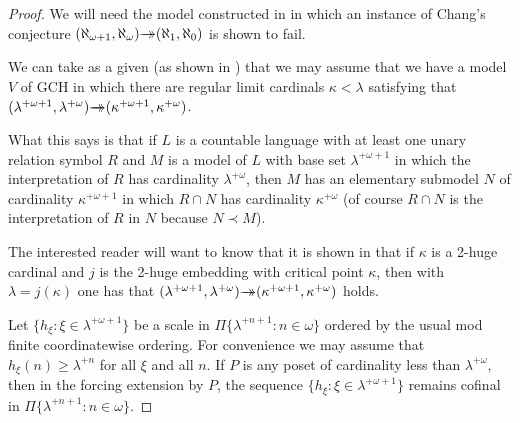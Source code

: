 \documentclass{amsart}
\theoremstyle{plain}
\theoremstyle{definition}
\theoremstyle{remark}
\theoremstyle{plain}
\theoremstyle{definition}
\theoremstyle{remark}
\begin{document}
  \begin{proof}
          We will need the model constructed in \cite{MR1045371} in
           which an instance of Chang's conjecture
           $(\aleph_{\omega+1},\aleph_\omega) \rlap{$\rightarrow$}\,{\rightarrow}
           (\aleph_1,\aleph_0)$ is shown to fail.

          We can take as a given (as shown in \cite[Theorem 5]{MR1045371}) that we may
          assume that we have a model $V$
          of GCH in which there are regular limit cardinals $\kappa<\lambda$
          satisfying that
          $(\lambda^{+\omega+1},\lambda^{+\omega})\rlap{$\rightarrow$}\,{\rightarrow}
          (\kappa^{+\omega+1},\kappa^{+\omega})$.


          What this says is that if $L$ is a countable language
          with at least one unary relation symbol $R$ and
           $M$ is a model of $L$  with base set $\lambda^{+\omega+1}$
          in which the interpretation of $R$ has cardinality
           $\lambda^{+\omega}$, then $M$ has an elementary submodel
           $N$ of cardinality $\kappa^{+\omega+1}$ in which
          $R\cap N$ has cardinality $\kappa^{+\omega}$ (of course
           $R\cap N$ is the interpretation of $R$ in $N$ because
          $N\prec M$).

          The interested reader will want to know that it is shown in
          \cite{MR1045371} that if $\kappa$ is a 2-huge cardinal and $j$ is the 2-huge
          embedding with critical point $\kappa$, then with
           $\lambda = j(\kappa)$ one has that
          $(\lambda^{+\omega+1},\lambda^{+\omega})\rlap{$\rightarrow$}\,{\rightarrow}
          (\kappa^{+\omega+1},\kappa^{+\omega})$ holds.
          \bigskip

          Let $\{ h_\xi : \xi \in \lambda^{+\omega+1}\}$
          be a scale in $\Pi\{ \lambda^{+n+1} : n\in \omega\}$
           ordered by the usual mod finite coordinatewise
          ordering. For convenience we may assume that $h_\xi(n) \geq
          \lambda^{+n}$ for all $\xi$ and all $n$.  If $P$ is any poset of
          cardinality less than $\lambda^{+\omega}$, then in the forcing
          extension by $P$,  the sequence
          $\{ h_\xi : \xi \in \lambda^{+\omega+1}\}$  remains cofinal in
           $\Pi\{ \lambda^{+n+1} : n\in \omega\}$.

          \bigskip


\end{proof}
\end{document}
